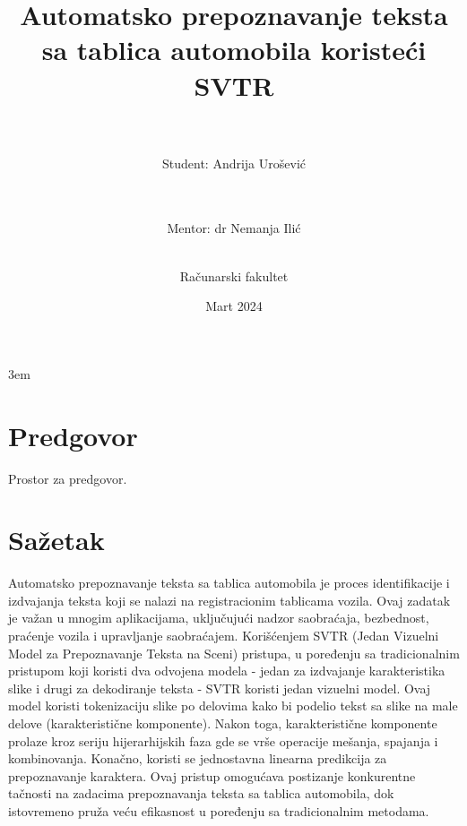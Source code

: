 \documentclass[a4paper,12pt,titlepage]{article}
\begin{document}
	\emergencystretch 3em
	\begin{titlepage}
		\title{Automatsko prepoznavanje teksta sa tablica automobila koristeći SVTR}
		\author{\\\\Student: Andrija Urošević\and \\\\Mentor: dr Nemanja Ilić\\\\ \and Računarski fakultet}
		\date{Mart 2024}
		\maketitle
	\end{titlepage}
	
	
	\section*{Predgovor}
	Prostor za predgovor. 
	\newpage
	
	\tableofcontents
	\newpage
	
	
	\section*{Sažetak}
	Automatsko prepoznavanje teksta sa tablica automobila je proces identifikacije i izdvajanja teksta koji se nalazi na registracionim tablicama vozila. Ovaj zadatak je važan u mnogim aplikacijama, uključujući nadzor saobraćaja, bezbednost, praćenje vozila i upravljanje saobraćajem. Korišćenjem SVTR (Jedan Vizuelni Model za Prepoznavanje Teksta na Sceni) pristupa, u poređenju sa tradicionalnim pristupom koji koristi dva odvojena modela - jedan za izdvajanje karakteristika slike i drugi za dekodiranje teksta - SVTR koristi jedan vizuelni model. Ovaj model koristi tokenizaciju slike po delovima kako bi podelio tekst sa slike na male delove (karakteristične komponente). Nakon toga, karakteristične komponente prolaze kroz seriju hijerarhijskih faza gde se vrše operacije mešanja, spajanja i kombinovanja. Konačno, koristi se jednostavna linearna predikcija za prepoznavanje karaktera. Ovaj pristup omogućava postizanje konkurentne tačnosti na zadacima prepoznavanja teksta sa tablica automobila, dok istovremeno pruža veću efikasnost u poređenju sa tradicionalnim metodama.
	\newpage
	
\end{document}
